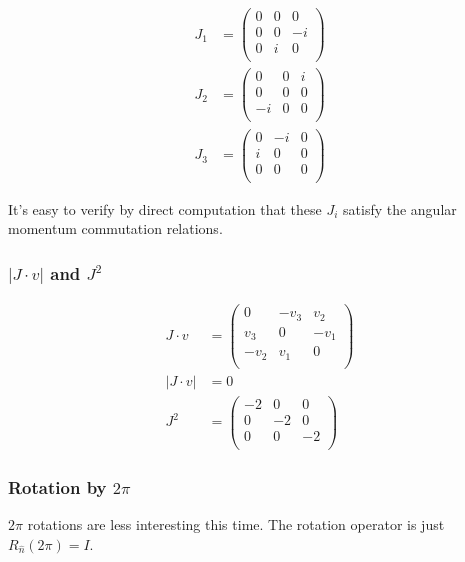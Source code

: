 \documentclass[12pt]{article}
\begin{document}
\begin{align*}
J_1 &= \left(
\begin{array}{ccc}
 0 & 0 & 0 \\
 0 & 0 & -i \\
 0 & i & 0 \\
\end{array}
\right)\\[6pt]
J_2 &=\left(
\begin{array}{ccc}
 0 & 0 & i \\
 0 & 0 & 0 \\
 -i & 0 & 0 \\
\end{array}
\right) \\[6pt]
J_3 &= \left(
\begin{array}{ccc}
 0 & -i & 0 \\
 i & 0 & 0 \\
 0 & 0 & 0 \\
\end{array}
\right)
\end{align*}

It's easy to verify by direct computation that these \(J_i\) satisfy the angular momentum commutation relations.


\subsubsection*{\(|J\cdot v|\) and \(J^2\)}

\begin{align*}
J\cdot v &= \left(
\begin{array}{ccc}
 0 & -v_3 & v_2 \\
 v_3 & 0 & -v_1 \\
 -v_2 & v_1 & 0 \\
\end{array}
\right)\\[6pt]
|J \cdot v| &= 0 \\
J^2 &= \left(
\begin{array}{ccc}
 -2 & 0 & 0 \\
 0 & -2 & 0 \\
 0 & 0 & -2 \\
\end{array}
\right)
\end{align*}
 
\subsubsection*{Rotation by \(2\pi\)}

\(2\pi\) rotations are less interesting this time. The rotation operator is just \(R_{\hat{n}}(2\pi) = I\).
\end{document}
